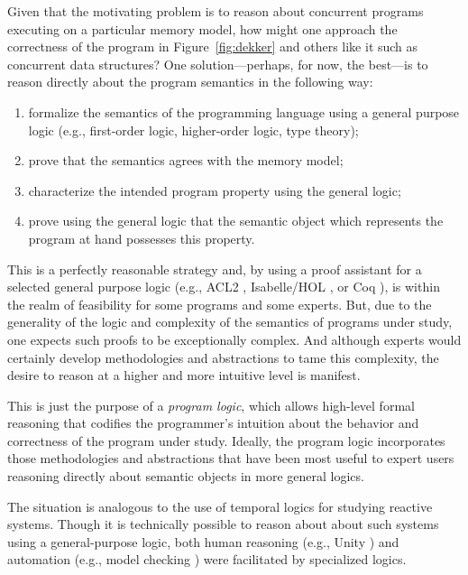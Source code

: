 \documentclass[11pt]{article}
\begin{document}
Given that the motivating problem is to reason about concurrent programs executing on a particular memory model, how might one approach the correctness of the program in Figure~\ref{fig:dekker} and others like it such as concurrent data structures? One solution---perhaps, for now, the best---is to reason directly about the program semantics in the following way:
\begin{enumerate}
\item formalize the semantics of the programming language using a general purpose logic (e.g., first-order logic, higher-order logic, type theory);

\item prove that the semantics agrees with the memory model;

\item characterize the intended program property using the general logic; 

\item prove using the general logic that the semantic object which represents the program at hand possesses this property.
\end{enumerate} 
This is a perfectly reasonable strategy and, by using a proof assistant for a selected general purpose logic (e.g., ACL2 \cite{DBLP:journals/tse/KaufmannM97}, Isabelle/HOL \cite{DBLP:books/sp/NipkowPW02}, or Coq \cite{CoqBook}), is within the realm of feasibility for some programs and some experts. But, due to the generality of the logic and complexity of the semantics of programs under study, one expects such proofs to be exceptionally complex. And although experts would certainly develop methodologies and abstractions to tame this complexity, the desire to reason at a higher and more intuitive level is manifest.

This is just the purpose of a \emph{program logic}, which allows high-level formal reasoning that codifies the programmer's intuition about the behavior and correctness of the program under study. Ideally, the program logic incorporates those methodologies and abstractions that have been most useful to expert users reasoning directly about semantic objects in more general logics.

The situation is analogous to the use of temporal logics for studying reactive systems. Though it is technically possible to reason about about such systems using a general-purpose logic, both human reasoning (e.g., Unity \cite{unity-book}) and automation (e.g., model checking \cite{model-checking}) were facilitated by specialized logics.
\end{document}
